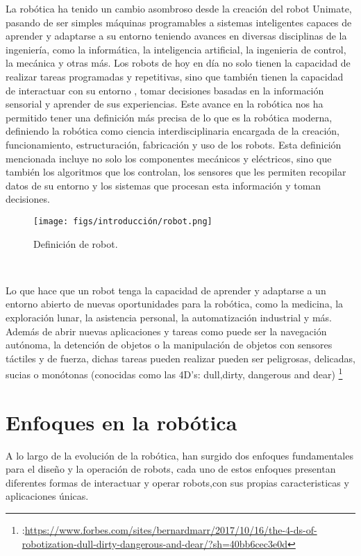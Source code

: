La robótica ha tenido un cambio asombroso desde la creación del robot Unimate, pasando de ser simples máquinas programables a sistemas inteligentes capaces de aprender y adaptarse 
a su entorno teniendo avances en diversas disciplinas de la ingeniería, como la informática, la inteligencia artificial, la ingenieria de control, la mecánica y otras más. 
Los robots de hoy en día no solo tienen la capacidad de realizar tareas programadas y repetitivas, sino que también tienen la capacidad de interactuar con su entorno
, tomar decisiones basadas en la información sensorial y aprender de sus experiencias. Este avance en la robótica nos ha permitido tener una definición más precisa de lo que es 
la robótica moderna, definiendo la robótica como ciencia interdisciplinaria encargada de la creación, funcionamiento, estructuración, fabricación y uso de los robots. 
Esta definición mencionada incluye no solo los componentes mecánicos y eléctricos, sino que también los algoritmos que los controlan, los sensores que les permiten recopilar
datos de su entorno y los sistemas que procesan esta información y toman decisiones.

\begin{figure} [H]
  \begin{center}
    \texttt{[image: figs/introducción/robot.png]}
  \end{center}
  \caption{Definición de robot.}
  \label{fig:robot}
\end{figure}\

Lo que hace que un robot tenga la capacidad de aprender y adaptarse a un entorno abierto de nuevas oportunidades para la robótica, como la medicina, la exploración
lunar, la asistencia personal, la automatización industrial y más. Además de abrir nuevas aplicaciones y tareas como puede ser la navegación autónoma, la detención de objetos o 
la manipulación de objetos con sensores táctiles y de fuerza, dichas tareas pueden realizar pueden ser peligrosas, delicadas, sucias o monótonas 
(conocidas como las 4D's: dull,dirty, dangerous and dear) \footnote{:\url{https://www.forbes.com/sites/bernardmarr/2017/10/16/the-4-ds-of-robotization-dull-dirty-dangerous-and-dear/?sh=40bb6cec3e0d}}

\section{Enfoques en la robótica}
\label{sec:enfoquesrobotica} %

A lo largo de la evolución de la robótica, han surgido dos enfoques fundamentales para el diseño y la operación de robots, cada uno de estos enfoques presentan diferentes
formas de interactuar y operar robots,con sus propias caracteristicas y aplicaciones únicas. 

